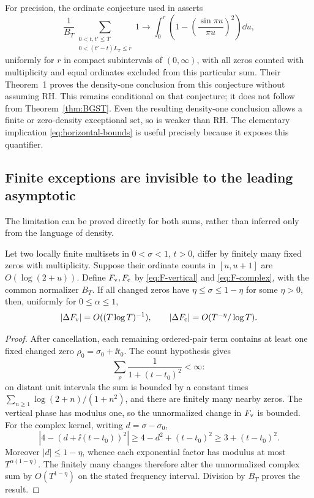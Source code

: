 For precision, the ordinate conjecture used in \cite{GLSS2026}
asserts
\begin{equation}\label{eq:ordinate-PCC}
 \frac1{B_T}\sum_{\substack{0<t,t'\le T\\0<(t'-t)L_T\le r}}1
 \longrightarrow\int_0^r
       \left(1-\left(\frac{\sin\pi u}{\pi u}\right)^2\right)\dd u,
\end{equation}
uniformly for \(r\) in compact subintervals of \((0,\infty)\),
with all zeros counted with multiplicity and equal ordinates
excluded from this particular sum. Their Theorem~1 proves the
density-one conclusion from this conjecture without assuming RH. This remains conditional
on that conjecture; it does not follow from
Theorem~\ref{thm:BGST}. Even the resulting density-one conclusion
allows a finite or zero-density exceptional set, so is weaker
than RH. The elementary implication \eqref{eq:horizontal-bounds}
is useful precisely because it exposes this quantifier.

\subsection{Finite exceptions are invisible to the leading asymptotic}
The limitation can be proved directly for both sums, rather than
inferred only from the language of density.

\begin{proposition}
\label{prop:finite-defects}
Let two locally finite multisets in \(0<\sigma<1\), \(t>0\),
differ by finitely many fixed zeros with multiplicity. Suppose
their ordinate counts in \([u,u+1]\) are \(O(\log(2+u))\).
Define \(F_{\rm v},F_{\rm c}\) by \eqref{eq:F-vertical} and
\eqref{eq:F-complex}, with the common normalizer \(B_T\).
If all changed zeros have \(\eta\le\sigma\le1-\eta\) for
some \(\eta>0\), then, uniformly for \(0\le\alpha\le1\),
\begin{equation}\label{eq:finite-defect-errors}
 |\Delta F_{\rm v}|=O((T\log T)^{-1}),\qquad
 |\Delta F_{\rm c}|=O(T^{-\eta}/\log T).
\end{equation}
\end{proposition}
\begin{proof}
After cancellation, each remaining ordered-pair term contains
at least one fixed changed zero \(\rho_0=\sigma_0+\ii t_0\).
The count hypothesis gives
\[
 \sum_\rho\frac1{1+(t-t_0)^2}<\infty:
\]
on distant unit intervals the sum is bounded by a constant times
\(\sum_{n\ge1}\log(2+n)/(1+n^2)\), and there are finitely
many nearby zeros. The vertical phase has modulus one, so
the unnormalized change in \(F_{\rm v}\) is bounded.
For the complex kernel, writing \(d=\sigma-\sigma_0\),
\[
 |4-(d+\ii(t-t_0))^2|
 \ge4-d^2+(t-t_0)^2\ge3+(t-t_0)^2.
\]
Moreover \(|d|\le1-\eta\), whence each exponential factor
has modulus at most \(T^{\alpha(1-\eta)}\).
The finitely many changes therefore alter the unnormalized
complex sum by \(O(T^{1-\eta})\) on the stated frequency
interval. Division by \(B_T\) proves the result.
\end{proof}

